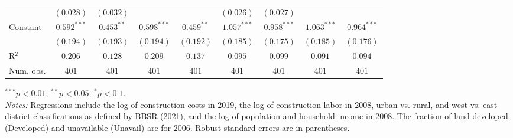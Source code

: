 \begin{table}
\begin{center}
\begin{footnotesize}
\begin{threeparttable}
\begin{tabular}{l@{} c@{} c@{} c@{} c@{} c@{} c@{} c@{} c@{}}
                                      & $(0.028)$      & $(0.032)$      &                &                & $(0.026)$      & $(0.027)$      &                &                \\
Constant                              & $0.592^{***}$  & $0.453^{**}$   & $0.598^{***}$  & $0.459^{**}$   & $1.057^{***}$  & $0.958^{***}$  & $1.063^{***}$  & $0.964^{***}$  \\
                                      & $(0.194)$      & $(0.193)$      & $(0.194)$      & $(0.192)$      & $(0.185)$      & $(0.175)$      & $(0.185)$      & $(0.176)$      \\
\midrule
R$^2$                                 & $0.206$        & $0.128$        & $0.209$        & $0.137$        & $0.095$        & $0.099$        & $0.091$        & $0.094$        \\
Num. obs.                             & $401$          & $401$          & $401$          & $401$          & $401$          & $401$          & $401$          & $401$          \\
\bottomrule
\end{tabular}
\begin{tablenotes}[flushleft]
\tiny{\item $^{***}p<0.01$; $^{**}p<0.05$; $^{*}p<0.1$. \\ \textit{Notes:} Regressions include the log of construction costs in 2019, the log of construction labor in 2008, urban vs. rural, and west vs. east district classifications as defined by BBSR (2021), and the log of population and household income in 2008. The fraction of land developed (Developed) and unavailable (Unavail) are for 2006. Robust standard errors are in parentheses.}
\end{tablenotes}
\end{threeparttable}
\end{footnotesize}
\label{tbl-iv-main-results-checked}
\end{center}
\end{table}

